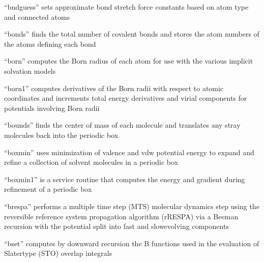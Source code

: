\documentclass[letterpaper,11pt,english]{sphinxmanual}
\begin{document}
\sphinxAtStartPar
{}

\sphinxAtStartPar
“bndguess” sets approximate bond stretch force constants based on atom type and connected atoms

\sphinxAtStartPar
{}

\sphinxAtStartPar
“bonds” finds the total number of covalent bonds and stores the atom numbers of the atoms defining each bond

\sphinxAtStartPar
{}

\sphinxAtStartPar
“born” computes the Born radius of each atom for use with the various implicit solvation models

\sphinxAtStartPar
{}

\sphinxAtStartPar
“born1” computes derivatives of the Born radii with respect to atomic coordinates and increments total energy derivatives and virial components for potentials involving Born radii

\sphinxAtStartPar
{}

\sphinxAtStartPar
“bounds” finds the center of mass of each molecule and translates any stray molecules back into the periodic box

\sphinxAtStartPar
{}

\sphinxAtStartPar
“boxmin” uses minimization of valence and vdw potential energy to expand and refine a collection of solvent molecules in a periodic box

\sphinxAtStartPar
{}

\sphinxAtStartPar
“boxmin1” is a service routine that computes the energy and gradient during refinement of a periodic box

\sphinxAtStartPar
{}

\sphinxAtStartPar
“brespa” performs a multiple time step (MTS) molecular dynamics step using the reversible reference system propagation algorithm (r\sphinxhyphen{}RESPA) via a Beeman recursion with the potential split into fast\sphinxhyphen{} and slow\sphinxhyphen{}evolving components

\sphinxAtStartPar
{}

\sphinxAtStartPar
“bset” computes by downward recursion the B functions used in the evaluation of Slater\sphinxhyphen{}type (STO) overlap integrals
\end{document}
